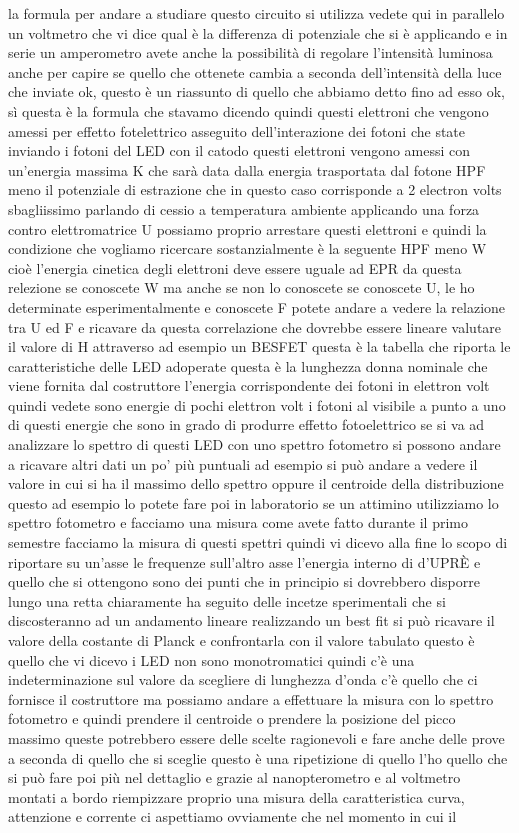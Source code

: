 la formula per andare a studiare questo circuito si utilizza vedete qui in parallelo un voltmetro che vi dice qual è la differenza di potenziale che si è applicando e in serie un amperometro avete anche la possibilità di regolare l'intensità luminosa anche per capire se quello che ottenete cambia a seconda dell'intensità della luce che inviate ok, questo è un riassunto di quello che abbiamo detto fino ad esso ok, sì questa è la formula che stavamo dicendo quindi questi elettroni che vengono amessi per effetto fotelettrico asseguito dell'interazione dei fotoni che state inviando i fotoni del LED con il catodo questi elettroni vengono amessi con un'energia massima K che sarà data dalla energia trasportata dal fotone HPF meno il potenziale di estrazione che in questo caso corrisponde a 2 electron volts sbagliissimo parlando di cessio a temperatura ambiente applicando una forza contro elettromatrice U possiamo proprio arrestare questi elettroni e quindi la condizione che vogliamo ricercare sostanzialmente è la seguente HPF meno W cioè l'energia cinetica degli elettroni deve essere uguale ad EPR da questa relezione se conoscete W ma anche se non lo conoscete se conoscete U, le ho determinate esperimentalmente e conoscete F potete andare a vedere la relazione tra U ed F e ricavare da questa correlazione che dovrebbe essere lineare valutare il valore di H attraverso ad esempio un BESFET questa è la tabella che riporta le caratteristiche delle LED adoperate questa è la lunghezza donna nominale che viene fornita dal costruttore l'energia corrispondente dei fotoni in elettron volt quindi vedete sono energie di pochi elettron volt i fotoni al visibile a punto a uno di questi energie che sono in grado di produrre effetto fotoelettrico se si va ad analizzare lo spettro di questi LED con uno spettro fotometro si possono andare a ricavare altri dati un po' più puntuali ad esempio si può andare a vedere il valore in cui si ha il massimo dello spettro oppure il centroide della distribuzione questo ad esempio lo potete fare poi in laboratorio se un attimino utilizziamo lo spettro fotometro e facciamo una misura come avete fatto durante il primo semestre facciamo la misura di questi spettri quindi vi dicevo alla fine lo scopo di riportare su un'asse le frequenze sull'altro asse l'energia interno di d'UPRÈ e quello che si ottengono sono dei punti che in principio si dovrebbero disporre lungo una retta chiaramente ha seguito delle incetze sperimentali che si discosteranno ad un andamento lineare realizzando un best fit si può ricavare il valore della costante di Planck e confrontarla con il valore tabulato questo è quello che vi dicevo i LED non sono monotromatici quindi c'è una indeterminazione sul valore da scegliere di lunghezza d'onda c'è quello che ci fornisce il costruttore ma possiamo andare a effettuare la misura con lo spettro fotometro e quindi prendere il centroide o prendere la posizione del picco massimo queste potrebbero essere delle scelte ragionevoli e fare anche delle prove a seconda di quello che si sceglie questo è una ripetizione di quello l'ho quello che si può fare poi più nel dettaglio e grazie al nanopterometro e al voltmetro montati a bordo riempizzare proprio una misura della caratteristica curva, attenzione e corrente ci aspettiamo ovviamente che nel momento in cui il 